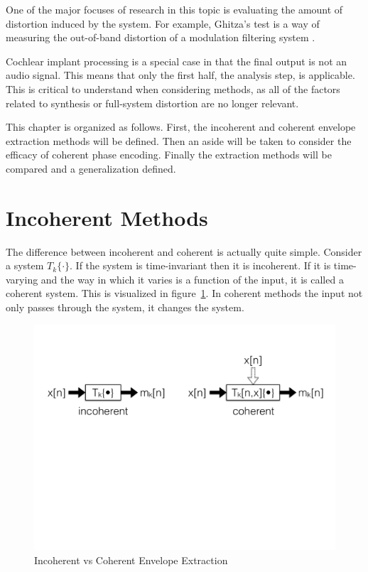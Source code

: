 \documentclass [11pt, proquest,oneside] {ganter_thesis}[2015/03/03]
\begin{document}
One of the major focuses of research in this topic is evaluating the amount of distortion induced by the system.  For example, Ghitza's test is a way of measuring the out-of-band distortion of a modulation filtering system \cite{ghitza2001upper}.

Cochlear implant processing is a special case in that the final output is not an audio signal.  This means that only the first half, the analysis step, is applicable.  This is critical to understand when considering methods, as all of the factors related to synthesis or full-system distortion are no longer relevant.

This chapter is organized as follows.  First, the incoherent and coherent envelope extraction methods will be defined.  Then an aside will be taken to consider the efficacy of coherent phase encoding.  Finally the extraction methods will be compared and a generalization defined.

\section{Incoherent Methods}

The difference between incoherent and coherent is actually quite simple.  Consider a system $T_k\{\cdot\}$.  If the system is time-invariant then it is incoherent.  If it is time-varying and the way in which it varies is a function of the input, it is called a coherent system.  This is visualized in figure~\ref{fig:incoherent_vs_coherent}.  In coherent methods the input not only passes through the system, it changes the system.

\begin{figure}[!ht]
  \centering
    \includegraphics[width=1\textwidth]{incoherent_vs_coherent}   
    \caption{Incoherent vs Coherent Envelope Extraction}\label{fig:incoherent_vs_coherent}
\end{figure}
\end{document}
